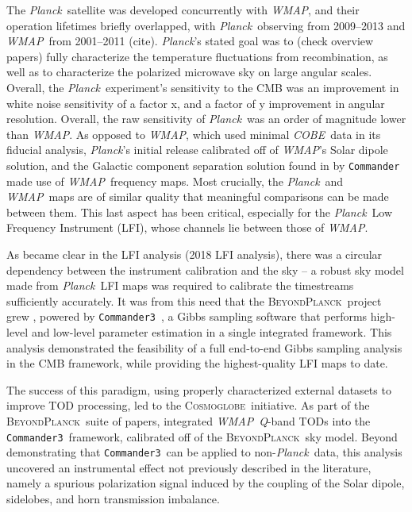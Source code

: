 \documentclass[twocolumn]{../../common/aa}
\def\WMAP{\emph{WMAP}}
\def\COBE{\emph{COBE}}
\def\Planck{\emph{Planck}}
\def\commander{\texttt{Commander}}
\def\commanderthree{\texttt{Commander3}}
\newcommand{\BP}{\textsc{BeyondPlanck}}
\newcommand{\cosmoglobe}{\textsc{Cosmoglobe}}
\newcommand{\Q}[0]{\textit Q}
\begin{document}
The \Planck\ satellite was developed concurrently with \WMAP, and their operation lifetimes briefly overlapped, with \Planck\ observing from 2009--2013 and \WMAP\ from 2001--2011 (cite). \Planck's stated goal was to (check overview papers) fully characterize the temperature fluctuations from recombination, as well as to characterize the polarized microwave sky on large angular scales.  Overall, the \Planck\ experiment's sensitivity to the CMB was an improvement in white noise sensitivity of a factor x, and a factor of y improvement in angular resolution. Overall, the raw sensitivity of \Planck\ was an order of magnitude lower than \WMAP. As opposed to \WMAP, which used minimal \COBE\ data in its fiducial analysis, \Planck's initial release calibrated off of \WMAP's Solar dipole solution, and the Galactic component separation solution found in  \citet{planck2014-a12} by \commander\ \citep{jewell2004,eriksen:2004,eriksen2006,eriksen2008} made use of \WMAP\ frequency maps. Most crucially, the \Planck\ and \WMAP\ maps are of similar quality that meaningful comparisons can be made between them. This last aspect has been critical, especially for the \Planck\ Low Frequency Instrument (LFI), whose channels lie between those of \WMAP.


As became clear in the LFI analysis (2018 LFI analysis), there was a circular dependency between the instrument calibration and the sky -- a robust sky model made from \Planck\ LFI maps was required to calibrate the timestreams sufficiently accurately. It was from this need that the \BP\ project grew \citep{bp01}, powered by \commanderthree\ \citep{bp03}, a Gibbs sampling software that performs high-level and low-level parameter estimation in a single integrated framework. This analysis demonstrated the feasibility of a full end-to-end Gibbs sampling analysis in the CMB framework, while providing the highest-quality LFI maps to date.

The success of this paradigm, using properly characterized external datasets to improve TOD processing, led to the \cosmoglobe\ initiative. As part of the \BP\ suite of papers, \citet{bp17} integrated \WMAP\ \Q-band TODs into the \commanderthree\ framework, calibrated off of the \BP\ sky model. Beyond demonstrating that \commanderthree\ can be applied to non-\Planck\ data, this analysis uncovered an instrumental effect not previously described in the literature, namely a spurious polarization signal induced by the coupling of the Solar dipole, sidelobes, and horn transmission imbalance. 
\end{document}
